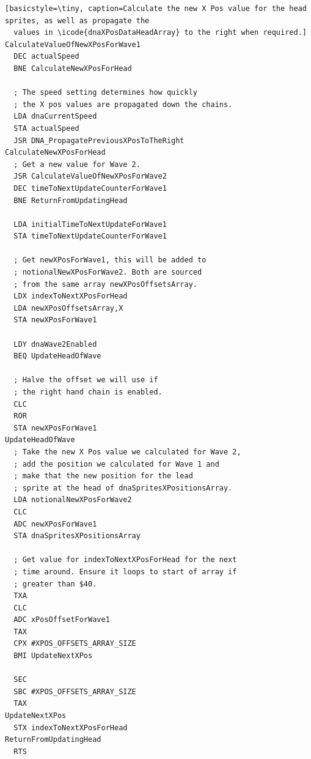 \begin{minipage}[b]{0.55\linewidth}
\centering
  \begin{lstlisting}[basicstyle=\tiny, caption=Calculate the new X Pos value for the head sprites, as well as propagate the
  values in \icode{dnaXPosDataHeadArray} to the right when required.]
CalculateValueOfNewXPosForWave1
  DEC actualSpeed
  BNE CalculateNewXPosForHead

  ; The speed setting determines how quickly 
  ; the X pos values are propagated down the chains.
  LDA dnaCurrentSpeed
  STA actualSpeed
  JSR DNA_PropagatePreviousXPosToTheRight
CalculateNewXPosForHead   
  ; Get a new value for Wave 2.
  JSR CalculateValueOfNewXPosForWave2
  DEC timeToNextUpdateCounterForWave1
  BNE ReturnFromUpdatingHead

  LDA initialTimeToNextUpdateForWave1
  STA timeToNextUpdateCounterForWave1

  ; Get newXPosForWave1, this will be added to
  ; notionalNewXPosForWave2. Both are sourced
  ; from the same array newXPosOffsetsArray.
  LDX indexToNextXPosForHead
  LDA newXPosOffsetsArray,X
  STA newXPosForWave1

  LDY dnaWave2Enabled
  BEQ UpdateHeadOfWave

  ; Halve the offset we will use if
  ; the right hand chain is enabled.
  CLC
  ROR 
  STA newXPosForWave1
UpdateHeadOfWave   
  ; Take the new X Pos value we calculated for Wave 2,
  ; add the position we calculated for Wave 1 and 
  ; make that the new position for the lead
  ; sprite at the head of dnaSpritesXPositionsArray.
  LDA notionalNewXPosForWave2
  CLC
  ADC newXPosForWave1
  STA dnaSpritesXPositionsArray

  ; Get value for indexToNextXPosForHead for the next
  ; time around. Ensure it loops to start of array if 
  ; greater than $40.
  TXA
  CLC
  ADC xPosOffsetForWave1
  TAX
  CPX #XPOS_OFFSETS_ARRAY_SIZE
  BMI UpdateNextXPos

  SEC
  SBC #XPOS_OFFSETS_ARRAY_SIZE
  TAX
UpdateNextXPos   
  STX indexToNextXPosForHead
ReturnFromUpdatingHead   
  RTS
\end{lstlisting}
\end{minipage}








